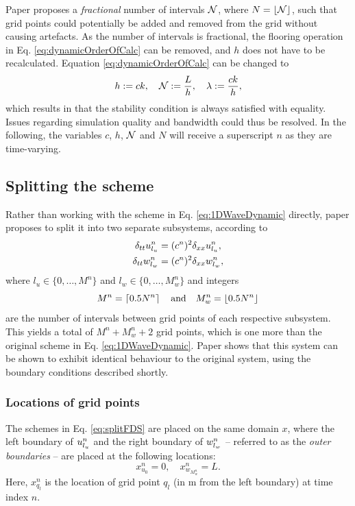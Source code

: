 Paper \citeP[G] proposes a \textit{fractional} number of intervals $\mathcal{N}$, where $N = \floor[\Nfrac]$, such that grid points could potentially be added and removed from the grid without causing artefacts. As the number of intervals is fractional, the flooring operation in Eq. \eqref{eq:dynamicOrderOfCalc} can be removed, and $h$ does not have to be recalculated. Equation \eqref{eq:dynamicOrderOfCalc} can be changed to
\begin{equation}\label{eq:newOrderOfCalc}
    h:= ck, \quad \mathcal{N} := \frac{L}{h}, \quad \lambda := \frac{ck}{h},
\end{equation}  
which results in that the stability condition is always satisfied with equality. Issues regarding simulation quality and bandwidth could thus be resolved. In the following, the variables $c$, $h$, $\mathcal{N}$ and $N$ will receive a superscript $n$ as they are time-varying.

\subsection{Splitting the scheme}
Rather than working with the scheme in Eq. \eqref{eq:1DWaveDynamic} directly, paper \citeP[G] proposes to split it into two separate subsystems, according to
\begin{subequations}\label{eq:splitFDS}
    \begin{align}
        \delta_{tt} u_{l_u}^n &= (c^n)^2\delta_{xx} u_{l_u}^n,\\
        \delta_{tt} w_{l_w}^n &= (c^n)^2\delta_{xx} w_{l_w}^n,
    \end{align}
\end{subequations}
where $l_u \in \{0, \hdots, M^n\}$ and $l_w \in \{0, \hdots, M_w^n\}$ and integers 
\begin{equation}
    M^n =\ceil[0.5 N^n] \qaq M_w^n =\floor[0.5 N^n]
\end{equation}
are the number of intervals between grid points of each respective subsystem. This yields a total of $M^n + M_w^n + 2$ grid points, which is one more than the original scheme in Eq. \eqref{eq:1DWaveDynamic}. Paper \citeP[G] shows that this system can be shown to exhibit identical behaviour to the original system, using the boundary conditions described shortly.

\subsubsection{Locations of grid points}
The schemes in Eq. \eqref{eq:splitFDS} are placed on the same domain $x$, where the left boundary of $u_{l_u}^n$ and the right boundary of $w_{l_w}^n$ -- referred to as the \textit{outer boundaries} -- are placed at the following locations:
\begin{equation}\label{eq:outerBoundaries}
    x_{u_0}^n = 0, \quad x_{w_{M_w^n}}^n = L.
\end{equation}
Here, $x_{q_l}^n$ is the location of grid point $q_l$ (in m from the left boundary) at time index $n$.

